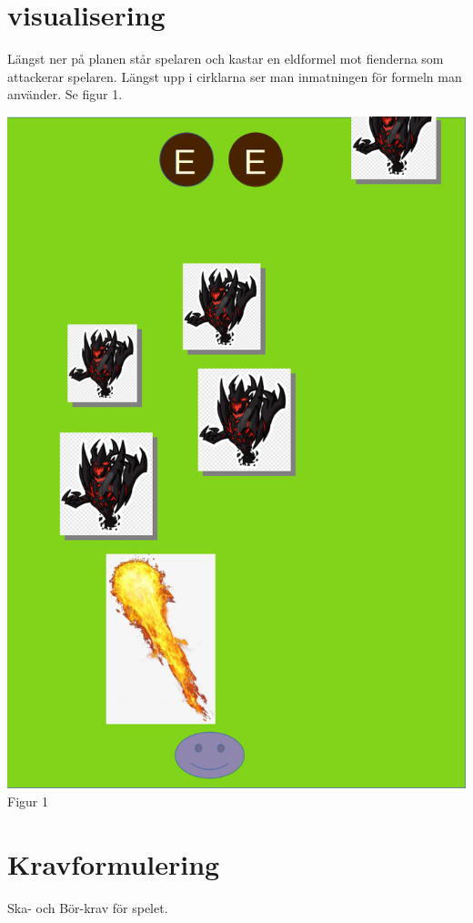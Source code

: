 \documentclass[12pt]{TDP005mall}
\begin{document}
\section{visualisering}
Längst ner på planen står spelaren och kastar en eldformel mot fienderna som attackerar spelaren. Längst upp i cirklarna ser man inmatningen för formeln man använder. Se figur 1.
\begin{center}
  \includegraphics[scale=0.45]{spel.png}\\
  Figur 1
\end{center}
\newpage

\section{Kravformulering}
Ska- och Bör-krav för spelet.
\end{document}
